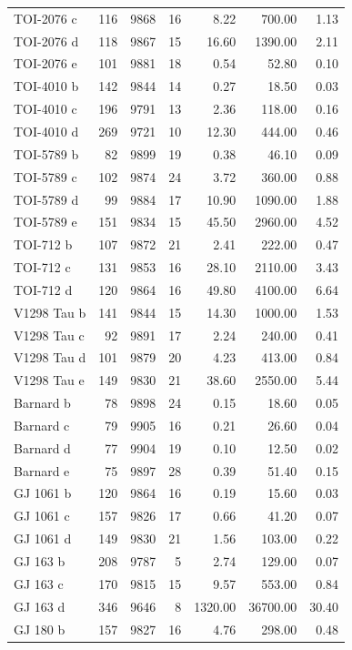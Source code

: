 \begin{table}
\begin{tabular}{lrrrrrr}
TOI-2076 c & 116 & 9868 & 16 & 8.22 & 700.00 & 1.13 \\
TOI-2076 d & 118 & 9867 & 15 & 16.60 & 1390.00 & 2.11 \\
TOI-2076 e & 101 & 9881 & 18 & 0.54 & 52.80 & 0.10 \\
TOI-4010 b & 142 & 9844 & 14 & 0.27 & 18.50 & 0.03 \\
TOI-4010 c & 196 & 9791 & 13 & 2.36 & 118.00 & 0.16 \\
TOI-4010 d & 269 & 9721 & 10 & 12.30 & 444.00 & 0.46 \\
TOI-5789 b & 82 & 9899 & 19 & 0.38 & 46.10 & 0.09 \\
TOI-5789 c & 102 & 9874 & 24 & 3.72 & 360.00 & 0.88 \\
TOI-5789 d & 99 & 9884 & 17 & 10.90 & 1090.00 & 1.88 \\
TOI-5789 e & 151 & 9834 & 15 & 45.50 & 2960.00 & 4.52 \\
TOI-712 b & 107 & 9872 & 21 & 2.41 & 222.00 & 0.47 \\
TOI-712 c & 131 & 9853 & 16 & 28.10 & 2110.00 & 3.43 \\
TOI-712 d & 120 & 9864 & 16 & 49.80 & 4100.00 & 6.64 \\
V1298 Tau b & 141 & 9844 & 15 & 14.30 & 1000.00 & 1.53 \\
V1298 Tau c & 92 & 9891 & 17 & 2.24 & 240.00 & 0.41 \\
V1298 Tau d & 101 & 9879 & 20 & 4.23 & 413.00 & 0.84 \\
V1298 Tau e & 149 & 9830 & 21 & 38.60 & 2550.00 & 5.44 \\
Barnard b & 78 & 9898 & 24 & 0.15 & 18.60 & 0.05 \\
Barnard c & 79 & 9905 & 16 & 0.21 & 26.60 & 0.04 \\
Barnard d & 77 & 9904 & 19 & 0.10 & 12.50 & 0.02 \\
Barnard e & 75 & 9897 & 28 & 0.39 & 51.40 & 0.15 \\
GJ 1061 b & 120 & 9864 & 16 & 0.19 & 15.60 & 0.03 \\
GJ 1061 c & 157 & 9826 & 17 & 0.66 & 41.20 & 0.07 \\
GJ 1061 d & 149 & 9830 & 21 & 1.56 & 103.00 & 0.22 \\
GJ 163 b & 208 & 9787 & 5 & 2.74 & 129.00 & 0.07 \\
GJ 163 c & 170 & 9815 & 15 & 9.57 & 553.00 & 0.84 \\
GJ 163 d & 346 & 9646 & 8 & 1320.00 & 36700.00 & 30.40 \\
GJ 180 b & 157 & 9827 & 16 & 4.76 & 298.00 & 0.48 \\

\end{tabular}
\end{table}

